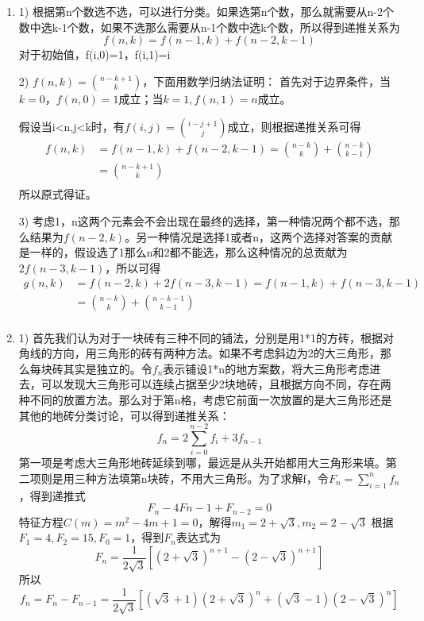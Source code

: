 \documentclass[a4paper]{article}
\begin{document}
\begin{enumerate}[]
\item 
\begin{solution}
    1) 根据第n个数选不选，可以进行分类。如果选第n个数，那么就需要从n-2个数中选k-1个数，如果不选那么需要从n-1个数中选k个数，所以得到递推关系为
    \begin{equation*}
        f(n,k)=f(n-1,k)+f(n-2,k-1)
    \end{equation*}
    对于初始值，f(i,0)=1，f(i,1)=i

    2) $f(n,k) = \binom{n-k+1}{k}$，下面用数学归纳法证明：
    首先对于边界条件，当$k=0，f(n,0)=1$成立；当$k=1,f(n,1)=n$成立。

    假设当i<n,j<k时，有$f(i,j) = \binom{i-j+1}{j}$成立，则根据递推关系可得
    \begin{align*}
        f(n,k) &= f(n-1,k)+f(n-2,k-1) = \binom{n-k}{k} + \binom{n-k}{k-1} \\
        &= \binom{n-k+1}{k} \\
    \end{align*}
    所以原式得证。

    3) 考虑1，n这两个元素会不会出现在最终的选择，第一种情况两个都不选，那么结果为$f(n-2,k)$。另一种情况是选择1或者n，这两个选择对答案的贡献是一样的，假设选了1那么n和2都不能选，那么这种情况的总贡献为$2f(n-3,k-1)$，所以可得
    \begin{align*}
        g(n,k) &= f(n-2,k) + 2f(n-3,k-1) = f(n-1,k) + f(n-3,k-1) \\
        &= \binom{n-k}{k} + \binom{n-k-1}{k-1}  \\
    \end{align*}
\end{solution}

\item 
\begin{solution}
    1) 首先我们认为对于一块砖有三种不同的铺法，分别是用1*1的方砖，根据对角线的方向，用三角形的砖有两种方法。如果不考虑斜边为2的大三角形，那么每块砖其实是独立的。令$f_n$表示铺设1*n的地方案数，将大三角形考虑进去，可以发现大三角形可以连续占据至少2块地砖，且根据方向不同，存在两种不同的放置方法。那么对于第n格，考虑它前面一次放置的是大三角形还是其他的地砖分类讨论，可以得到递推关系：
    \begin{equation*}
        f_n = 2 \sum_{i=0} ^ {n-2} f_i + 3f_{n-1}
    \end{equation*}
    第一项是考虑大三角形地砖延续到哪，最远是从头开始都用大三角形来填。第二项则是用三种方法填第n块砖，不用大三角形。为了求解f，令$F_n=\sum_{i=1}^n f_n$，得到递推式
    \begin{equation*}
        F_n -4F{n-1} + F_{n-2} = 0
    \end{equation*}
    特征方程$C(m)=m^2-4m+1=0$，解得$m_1=2+\sqrt{3},m_2=2-\sqrt{3}$
    根据$F_1=4,F_2=15,F_0=1$，得到$F_n$表达式为
    \begin{equation*}
        F_n = \frac{1}{2\sqrt{3}} [ (2+\sqrt{3})^{n+1} - (2-\sqrt{3})^{n+1}]
    \end{equation*}
    所以 
    \begin{equation*}
        f_n = F_n-F_{n-1}=\frac{1}{2\sqrt{3}} [ (\sqrt{3}+1)(2+\sqrt{3})^{n} + (\sqrt{3}-1)(2-\sqrt{3})^{n}]
    \end{equation*}


\end{solution}
\end{enumerate}
\end{document}
